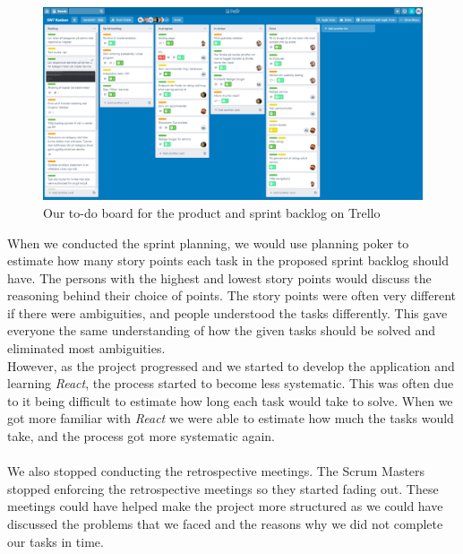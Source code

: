 \begin{figure}[H]
    \centering
    \includegraphics[width=0.8\linewidth]{figures/trellopicture.PNG}
    \caption{Our to-do board for the product and sprint backlog on Trello}
    \label{fig:trello-board}
\end{figure}
\noindent
When we conducted the sprint planning, we would use planning poker to estimate how many story points each task in the proposed sprint backlog should have.
The persons with the highest and lowest story points would discuss the reasoning behind their choice of points.
The story points were often very different if there were ambiguities, and people understood the tasks differently.
This gave everyone the same understanding of how the given tasks should be solved and eliminated most ambiguities. 
\\
However, as the project progressed and we started to develop the application and learning \textit{React}, the process started to become less systematic.
This was often due to it being difficult to estimate how long each task would take to solve.
When we got more familiar with \textit{React} we were able to estimate how much the tasks would take, and the process got more systematic again.
\\\\
We also stopped conducting the retrospective meetings.
The Scrum Masters stopped enforcing the retrospective meetings so they started fading out.
These meetings could have helped make the project more structured as we could have discussed the problems that we faced and the reasons why we did not complete our tasks in time.

